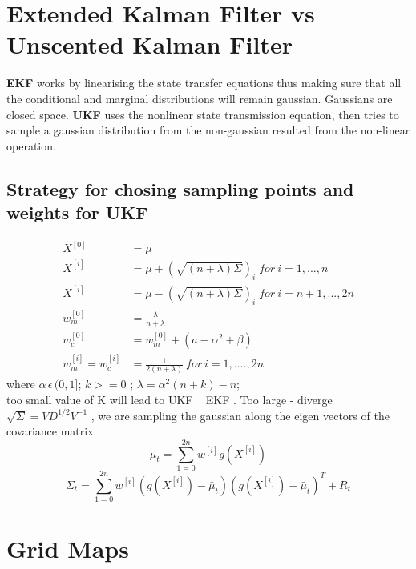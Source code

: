 \documentclass{article}
\begin{document}
\section{Extended Kalman Filter vs Unscented Kalman Filter}
\textbf{EKF} works by linearising the state transfer equations 
thus making sure that all the conditional and marginal distributions 
will remain gaussian. Gaussians are closed space. \textbf{UKF} uses
the nonlinear state transmission equation, then tries to sample a 
gaussian distribution from the non-gaussian resulted from the non-linear
operation. 
\subsection{Strategy for chosing sampling points and weights for UKF}
\begin{align*}
X^{[0]} &= \mu\\
X^{[i]} &= \mu + (\sqrt{(n+\lambda)\Sigma})_i  \; for\: i = 1,...,n\\
X^{[i]} &= \mu - (\sqrt{(n+\lambda)\Sigma})_i  \; for\: i = n+1,...,2n\\
w_m^{[0]} &= \frac{\lambda}{n + \lambda}\\
w_c^{[0]} &= w_m^{[0]} + (a -\alpha^2 + \beta)\\
w_m^{[i]} = w_c^{[i]} &= \frac{1}{2(n+\lambda)} \: for \: i = 1,....,2n
\end{align*}
where $\alpha \, \epsilon \, (0,1]$; $k>= 0$ ; $\lambda = \alpha^2(n+k) - n$;\\
too small value of K will lead to UKF ~ EKF . Too large - diverge\\
$\sqrt{\Sigma} =  VD^{1/2}V^{-1}$ , we are sampling the gaussian along the eigen vectors
of the covariance matrix. \\
$$\bar\mu_t = \sum_{1 = 0}^{2n}w^{[i]}g(X^{[i]})$$
$$\bar\Sigma_t = \sum_{1 = 0}^{2n}w^{[i]}(g(X^{[i]}) - \bar\mu_t)(g(X^{[i]}) - \bar\mu_t)^T + R_t$$
\section{Grid Maps}
\end{document}
